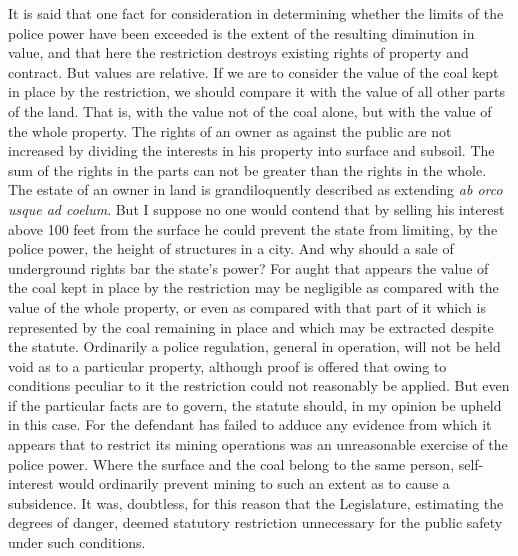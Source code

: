 It is said that one fact for consideration in determining whether the limits of
the police power have been exceeded is the extent of the resulting diminution in
value, and that here the restriction destroys existing rights of property and
contract. But values are relative. If we are to consider the value of the coal
kept in place by the restriction, we should compare it with the value of all
other parts of the land. That is, with the value not of the coal alone, but with
the value of the whole property. The rights of an owner as against the public
are not increased by dividing the interests in his property into surface and
subsoil. The sum of the rights in the parts can not be greater than the rights
in the whole. The estate of an owner in land is grandiloquently described as
extending \emph{ab orco usque ad coelum}. But I suppose no one would contend
that by selling his interest above 100 feet from the surface he could prevent
the state from limiting, by the police power, the height of structures in a
city. And why should a sale of underground rights bar the state's power? For
aught that appears the value of the coal kept in place by the restriction may be
negligible as compared with the value of the whole property, or even as compared
with that part of it which is represented by the coal remaining in place and
which may be extracted despite the statute. Ordinarily a police regulation,
general in operation, will not be held void as to a particular property,
although proof is offered that owing to conditions peculiar to it the
restriction could not reasonably be applied. But even if the particular facts
are to govern, the statute should, in my opinion be upheld in this case. For the
defendant has failed to adduce any evidence from which it appears that to
restrict its mining operations was an unreasonable exercise of the police power.
Where the surface and the coal belong to the same person, self-interest would
ordinarily prevent mining to such an extent as to cause a subsidence. It was,
doubtless, for this reason that the Legislature, estimating the degrees of
danger, deemed statutory restriction unnecessary for the public safety under
such conditions.

